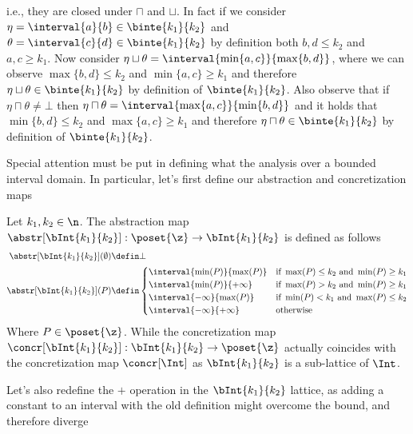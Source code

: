 i.e., they are closed under \(\sqcap\) and \(\sqcup\). In fact if we
consider \({\eta = \interval{a}{b} \in \binte{k_1}{k_2}}\) and
\({\theta = \interval{c}{d} \in \binte{k_1}{k_2}}\) by definition both
\(b,d \leq k_2\) and \(a,c \geq k_1\). Now consider
\({\eta \sqcup \theta = \interval{\min\{a,c\}}{\max\{b,d\}}}\), where
we can observe \(\max\{b,d\} \leq k_2\) and \(\min\{a,c\} \geq k_1\)
and therefore \({\eta \sqcup \theta \in \binte{k_1}{k_2}}\) by
definition of \(\binte{k_1}{k_2}\).  Also observe that if
\(\eta \sqcap \theta \neq \bot\) then
\({\eta \sqcap \theta = \interval{\max\{a,c\}}{\min\{b,d\}}}\) and it
holds that \({\min\{b,d\} \leq k_2}\) and \({\max\{a,c\} \geq k_1}\)
and therefore \({\eta \sqcap \theta \in \binte{k_1}{k_2}}\) by definition of
\(\binte{k_1}{k_2}\).

\medskip

\noindent
Special attention must be put in defining what the analysis over a
bounded interval domain. In particular, let's first define our
abstraction and concretization maps

\begin{definition}\label{def:boundedac}
  Let \(k_1, k_2\in\n\). The abstraction map
  \({\abstr[\bInt{k_1}{k_2}] : \poset{\z} \to \bInt{k_1}{k_2}}\) is
  defined as follows
  \begin{align*}
    \abstr[\bInt{k_1}{k_2}](\emptyset) & \defin \bot \\
    \abstr[\bInt{k_1}{k_2}](P) & \defin \begin{cases}
      \interval{\min(P)}{\max(P)} & \text{if } \max(P) \leq k_2 \text{ and } \min(P) \geq k_1\\
      \interval{\min(P)}{+\infty} & \text{if } \max(P) > k_2 \text{ and } \min(P) \geq k_1 \\
      \interval{-\infty}{\max(P)} & \text{if } \min(P) < k_1 \text{ and } \max(P) \leq k_2 \\
      \interval{-\infty}{+\infty} & \text{otherwise}
    \end{cases}
  \end{align*}
  Where \(P\in\poset{\z}\). While the concretization map
  \({\concr[\bInt{k_1}{k_2}] : \bInt{k_1}{k_2} \to \poset{\z}}\)
  actually coincides with the concretization map \(\concr[\Int]\) as
  \(\bInt{k_1}{k_2}\) is a sub-lattice of \(\Int\).
\end{definition}

Let's also redefine the \(+\) operation in the \(\bInt{k_1}{k_2}\)
lattice, as adding a constant to an interval with the old definition
might overcome the bound, and therefore diverge

